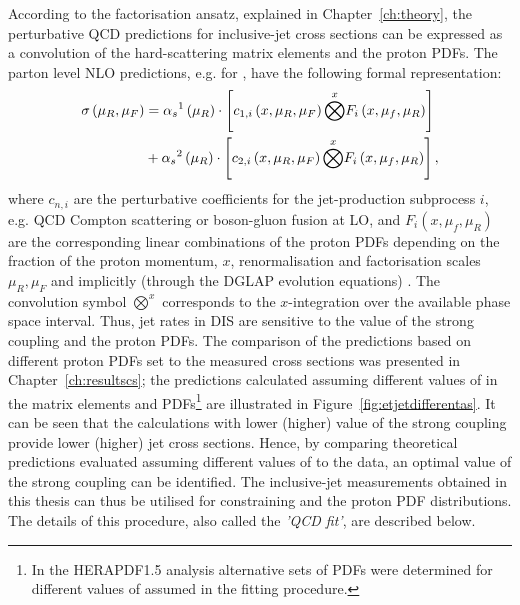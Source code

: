 According to the factorisation ansatz, explained in Chapter~\ref{ch:theory}, the perturbative QCD predictions for inclusive-jet cross sections can be expressed as a convolution of the hard-scattering matrix elements and the proton PDFs. The parton level NLO predictions, e.g. for \dsdetjetb, have the following formal representation:
\begin{equation}
	\begin{split}
\sigma\left( \mu_R, \mu_F\right)  &= \mbox{$\alpha_{s}$}^1\left( \mu_R\right) \cdot \left[ c_{1,i}\left( x, \mu_R, \mu_F\right) \overset{x}{\bigotimes } F_i\left( x, \mu_f, \mu_R \right) \right] \\
&+ \mbox{$\alpha_{s}$}^2\left( \mu_R\right) \cdot \left[ c_{2,i}\left( x, \mu_R, \mu_F\right) \overset{x}{\bigotimes } F_i\left( x, \mu_f, \mu_R \right) \right],
	\end{split}
	\label{eq:fitnloqcdpredictions}
\end{equation}
where $c_{n,i}$ are the perturbative coefficients for the jet-production subprocess $i$, e.g. QCD Compton scattering or boson-gluon fusion at LO, and $F_i\left( x, \mu_f, \mu_R \right)$ are the corresponding linear combinations of the proton PDFs depending on the fraction of the proton momentum, $x$, renormalisation and factorisation scales $\mu_R, \mu_F$ and implicitly (through the DGLAP evolution equations) \as. The convolution symbol $\overset{x}{\bigotimes}$ corresponds to the $x$-integration over the available phase space interval. Thus, jet rates in DIS are sensitive to the value of the strong coupling and the proton PDFs. The comparison of the predictions based on different proton PDFs set to the measured cross sections was presented in Chapter~\ref{ch:resultscs}; the predictions calculated assuming different values of \asz in the matrix elements and PDFs\footnote{In the HERAPDF1.5 analysis alternative sets of PDFs were determined for different values of \asz assumed in the fitting procedure.} are illustrated in Figure~\ref{fig:etjetdifferentas}. It can be seen that the calculations with lower (higher) value of the strong coupling provide lower (higher) jet cross sections. Hence, by comparing theoretical predictions evaluated assuming different values of \asz to the data, an optimal value of the strong coupling can be identified. The inclusive-jet measurements obtained in this thesis can thus be utilised for constraining \as and the proton PDF distributions. The details of this procedure, also called the \emph{'QCD fit'}, are described below.



